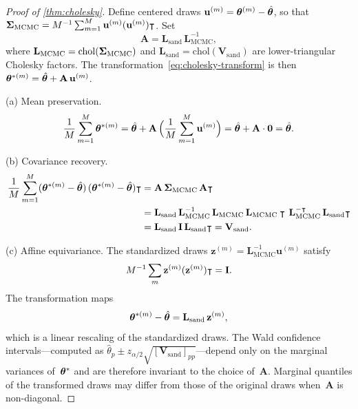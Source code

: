 \begin{proof}[Proof of \textup{\cref{thm:cholesky}}]
  Define centered draws
  $\mathbf{u}^{(m)} = \boldsymbol{\theta}^{(m)} - \hat{\boldsymbol{\theta}}$, so that
  $\boldsymbol{\Sigma}_{\mathrm{MCMC}}
  = M^{-1}\sum_{m=1}^{M}\mathbf{u}^{(m)}(\mathbf{u}^{(m)})\intercal$.
  Set
  \begin{equation}\label{smc:eq-A}
    \mathbf{A}
    = \mathbf{L}_{\mathrm{sand}}\,\mathbf{L}_{\mathrm{MCMC}}^{-1},
  \end{equation}
  where $\mathbf{L}_{\mathrm{MCMC}}
  = \mathrm{chol}(\boldsymbol{\Sigma}_{\mathrm{MCMC}})$ and
  $\mathbf{L}_{\mathrm{sand}}
  = \mathrm{chol}(\mathbf{V}_{\mathrm{sand}})$ are lower-triangular
  Cholesky factors.  The transformation~\eqref{eq:cholesky-transform} is
  then $\boldsymbol{\theta}^{*(m)} = \hat{\boldsymbol{\theta}} + \mathbf{A}\,\mathbf{u}^{(m)}$.

  \medskip\noindent
  \textup{(a) Mean preservation.}
  \[
    \frac{1}{M}\sum_{m=1}^{M}\boldsymbol{\theta}^{*(m)}
    = \hat{\boldsymbol{\theta}}
      + \mathbf{A}\,\Bigl(\frac{1}{M}\sum_{m=1}^{M}\mathbf{u}^{(m)}\Bigr)
    = \hat{\boldsymbol{\theta}} + \mathbf{A}\cdot\mathbf{0}
    = \hat{\boldsymbol{\theta}}.
  \]

  \noindent
  \textup{(b) Covariance recovery.}
  \begin{align}
    \frac{1}{M}\sum_{m=1}^{M}
      (\boldsymbol{\theta}^{*(m)} - \hat{\boldsymbol{\theta}})\,
      (\boldsymbol{\theta}^{*(m)} - \hat{\boldsymbol{\theta}})\intercal
    &= \mathbf{A}\,\boldsymbol{\Sigma}_{\mathrm{MCMC}}\,\mathbf{A}\intercal
      \notag \\
    &= \mathbf{L}_{\mathrm{sand}}\,
       \mathbf{L}_{\mathrm{MCMC}}^{-1}\,
       \mathbf{L}_{\mathrm{MCMC}}\,
       \mathbf{L}_{\mathrm{MCMC}}\intercal\,
       \mathbf{L}_{\mathrm{MCMC}}^{-\intercal}\,
       \mathbf{L}_{\mathrm{sand}}\intercal
      \notag \\
    &= \mathbf{L}_{\mathrm{sand}}\,\mathbf{I}\,
       \mathbf{L}_{\mathrm{sand}}\intercal
     = \mathbf{V}_{\mathrm{sand}}.
      \label{smc:eq-cholesky-var}
  \end{align}

  \noindent
  \textup{(c) Affine equivariance.}
  The standardized draws
  $\mathbf{z}^{(m)} = \mathbf{L}_{\mathrm{MCMC}}^{-1}\mathbf{u}^{(m)}$
  satisfy
  \[
    M^{-1}\sum_m \mathbf{z}^{(m)}(\mathbf{z}^{(m)})\intercal = \mathbf{I}.
  \]
  The transformation maps
  \[
    \boldsymbol{\theta}^{*(m)} - \hat{\boldsymbol{\theta}}
    = \mathbf{L}_{\mathrm{sand}}\,\mathbf{z}^{(m)},
  \]
  which is a linear rescaling of the standardized draws.  The
  Wald confidence intervals---computed as
  $\hat{\theta}_p \pm z_{\alpha/2}\sqrt{[\mathbf{V}_{\mathrm{sand}}]_{pp}}$---depend
  only on the marginal variances of~$\boldsymbol{\theta}^*$ and are therefore
  invariant to the choice of~$\mathbf{A}$.  Marginal quantiles of
  the transformed draws may differ from those of the original
  draws when~$\mathbf{A}$ is non-diagonal.
\end{proof}

